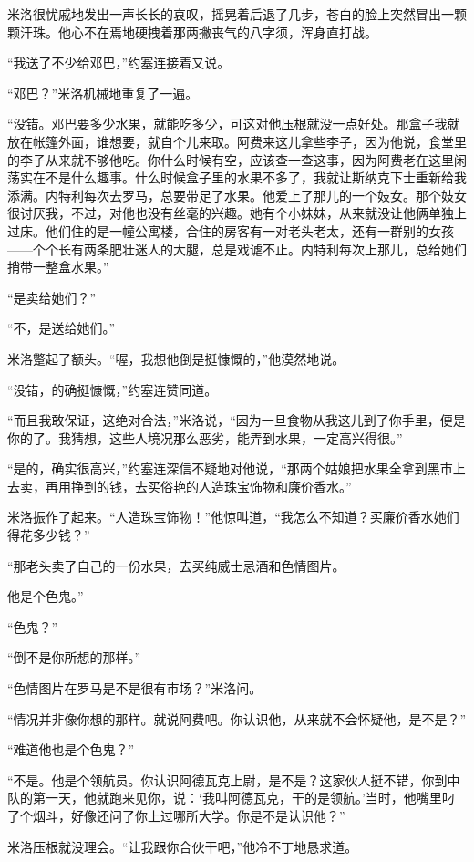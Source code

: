     米洛很忧戚地发出一声长长的哀叹，摇晃着后退了几步，苍白的脸上突然冒出一颗颗汗珠。他心不在焉地硬拽着那两撇丧气的八字须，浑身直打战。

    “我送了不少给邓巴，”约塞连接着又说。

    “邓巴？”米洛机械地重复了一遍。

    “没错。邓巴要多少水果，就能吃多少，可这对他压根就没一点好处。那盒子我就放在帐篷外面，谁想要，就自个儿来取。阿费来这儿拿些李子，因为他说，食堂里的李子从来就不够他吃。你什么时候有空，应该查一查这事，因为阿费老在这里闲荡实在不是什么趣事。什么时候盒子里的水果不多了，我就让斯纳克下士重新给我添满。内特利每次去罗马，总要带足了水果。他爱上了那儿的一个妓女。那个妓女很讨厌我，不过，对他也没有丝毫的兴趣。她有个小妹妹，从来就没让他俩单独上过床。他们住的是一幢公寓楼，合住的房客有一对老头老太，还有一群别的女孩——个个长有两条肥壮迷人的大腿，总是戏谑不止。内特利每次上那儿，总给她们捎带一整盒水果。”

    “是卖给她们？”

    “不，是送给她们。”

    米洛蹩起了额头。“喔，我想他倒是挺慷慨的，”他漠然地说。

    “没错，的确挺慷慨，”约塞连赞同道。

    “而且我敢保证，这绝对合法，”米洛说，“因为一旦食物从我这儿到了你手里，便是你的了。我猜想，这些人境况那么恶劣，能弄到水果，一定高兴得很。”

    “是的，确实很高兴，”约塞连深信不疑地对他说，“那两个姑娘把水果全拿到黑市上去卖，再用挣到的钱，去买俗艳的人造珠宝饰物和廉价香水。”

    米洛振作了起来。“人造珠宝饰物！”他惊叫道，“我怎么不知道？买廉价香水她们得花多少钱？”

    “那老头卖了自己的一份水果，去买纯威士忌酒和色情图片。

    他是个色鬼。”

    “色鬼？”

    “倒不是你所想的那样。”

    “色情图片在罗马是不是很有市场？”米洛问。

    “情况并非像你想的那样。就说阿费吧。你认识他，从来就不会怀疑他，是不是？”

    “难道他也是个色鬼？”

    “不是。他是个领航员。你认识阿德瓦克上尉，是不是？这家伙人挺不错，你到中队的第一天，他就跑来见你，说：‘我叫阿德瓦克，干的是领航。’当时，他嘴里叼了个烟斗，好像还问了你上过哪所大学。你是不是认识他？”

    米洛压根就没理会。“让我跟你合伙干吧，”他冷不丁地恳求道。

